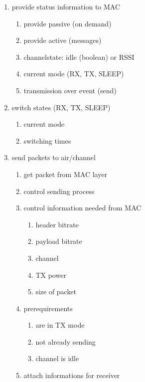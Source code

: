 \begin{enumerate}
 \item provide status information to MAC
	\begin{enumerate}
	\item provide passive (on demand) \label{provpassive}
	\item provide active (messages) \label{provactive}
	\item channelstate: idle (boolean) or RSSI \label{channelstate}
	\item current mode (RX, TX, SLEEP) \label{currentmode}
	\item transmission over event (send) \label{txover}
	\end{enumerate}
 \item switch states (RX, TX, SLEEP)
	\begin{enumerate}
	\item current mode \label{switchmode}
	\item switching times \label{switchtimes}
	\end{enumerate}
 \item send packets to air/channel
	\begin{enumerate}
	\item get packet from MAC layer\label{packetFromMac}
	\item control sending process\label{sendControl}
	\item control information needed from MAC
		\begin{enumerate}
		\item header bitrate\label{sendCtrlHeaderBitrate}
		\item payload bitrate\label{sendCtrlBitrate}
		\item channel\label{sendCtrlChannel}
		\item TX power\label{sendCtrlTXPower}
		\item size of packet\label{sendCtrlSize}
		\end{enumerate}
	\item prerequirements
		\begin{enumerate}
		\item are in TX mode \label{sendPreqMode}
		\item not already sending \label{sendPreqSending}
		\item channel is idle \label{sendPreqIdle}		
		\end{enumerate}
	\item attach informations for receiver
		\begin{enumerate}

\end{enumerate}
\end{enumerate}
\end{enumerate}
